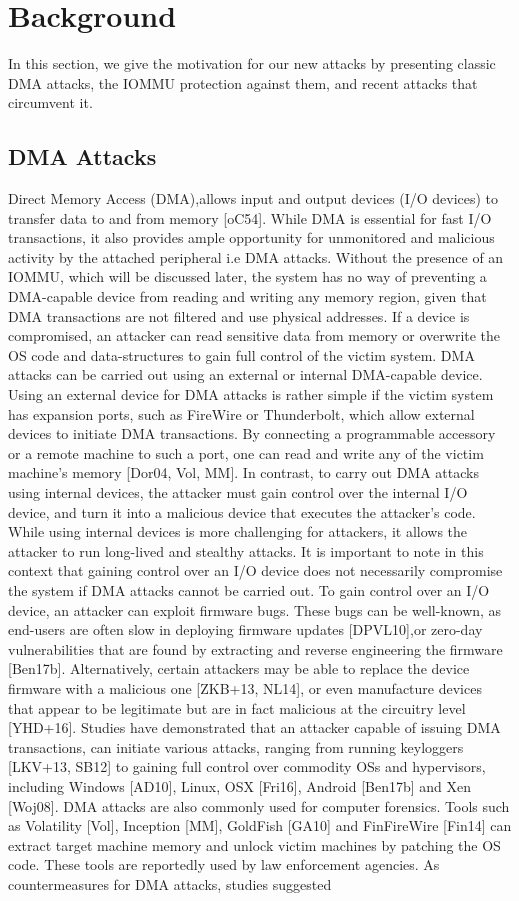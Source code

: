 \section{Background}
In this section, we give the motivation for our new attacks by presenting classic DMA attacks, the IOMMU protection against them, and recent attacks that circumvent it.
\subsection{DMA Attacks}
Direct Memory Access (DMA),allows input and output devices (I/O devices) to transfer data to and from memory [oC54]. While DMA is essential for fast I/O transactions, it also provides ample opportunity for unmonitored and malicious activity by the attached peripheral i.e DMA attacks. Without the presence of an IOMMU, which will be discussed later, the system has no way of preventing a DMA-capable device from reading and writing any memory region, given that DMA transactions are not filtered and use physical addresses. If a device is compromised, an attacker can read sensitive data from memory or overwrite the OS code and data-structures to gain full control of the victim system. DMA attacks can be carried out using an external or internal DMA-capable device. Using an external device for DMA attacks is rather simple if the victim system has expansion ports, such as FireWire or Thunderbolt, which allow external devices to initiate DMA transactions. By connecting a programmable accessory or a remote machine to such a port, one can read and write any of the victim machine’s memory [Dor04, Vol, MM]. In contrast, to carry out DMA attacks using internal devices, the attacker must gain control over the internal I/O device, and turn it into a malicious device that executes the attacker’s code. While using internal devices is more challenging for attackers, it allows the attacker to run long-lived and stealthy attacks. It is important to note in this context that gaining control over an I/O device does not necessarily compromise the system if DMA attacks cannot be carried out. To gain control over an I/O device, an attacker can exploit firmware bugs. These bugs can be well-known, as end-users are often slow in deploying firmware updates [DPVL10],or zero-day vulnerabilities that are found by extracting and reverse engineering the firmware [Ben17b]. Alternatively, certain attackers may be able to replace the device firmware with a malicious one [ZKB+13, NL14], or even manufacture devices that appear to be legitimate but are in fact malicious at the circuitry level [YHD+16]. Studies have demonstrated that an attacker capable of issuing DMA transactions, can initiate various attacks, ranging from running keyloggers [LKV+13, SB12] to gaining full control over commodity OSs and hypervisors, including Windows [AD10], Linux, OSX [Fri16], Android [Ben17b] and Xen [Woj08]. DMA attacks are also commonly used for computer forensics. Tools such as Volatility [Vol], Inception [MM], GoldFish [GA10] and FinFireWire [Fin14] can extract target machine memory and unlock victim machines by patching the OS code. These tools are reportedly used by law enforcement agencies. As countermeasures for DMA attacks, studies suggested 